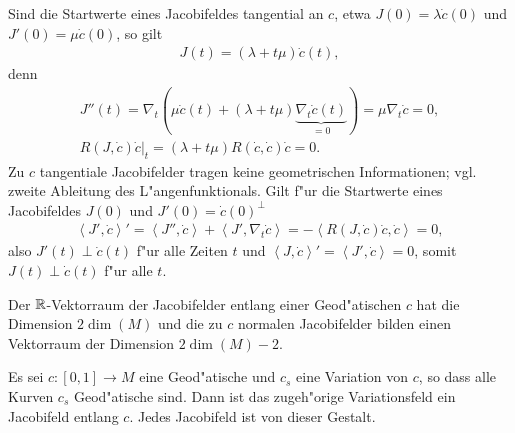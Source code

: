 Sind die Startwerte eines Jacobifeldes tangential an $c$, etwa $J(0) =
\lambda \dot c(0)$ und $J'(0) = \mu \dot c(0)$, so gilt
\begin{align*}
  J(t) = (\lambda + t\mu)\dot c(t),
\end{align*}
denn
\begin{align*}
  J''(t) = \nabla_t(\mu \dot c(t) + (\lambda + t \mu)\underbrace{\nabla_t\dot c(t)}_{=0}) = \mu\nabla_t\dot c = 0,\\
  \left.R(J,\dot c)\dot c\right|_t = (\lambda + t\mu)R(\dot c, \dot c)\dot c = 0.
\end{align*}
Zu $c$ tangentiale Jacobifelder tragen keine geometrischen Informationen; vgl. zweite Ableitung des L"angenfunktionals.
Gilt f"ur die Startwerte eines Jacobifeldes $J(0)$ und $J'(0) = \dot c(0)^{\perp}$
\begin{align*}
  \left<J',\dot c\right>' = \left<J'',\dot c\right> + \left<J', \nabla_t\dot c\right> = - \left<R(J,\dot c)\dot c,\dot c\right> = 0,
\end{align*}
also $J'(t) \perp \dot c(t)$ f"ur alle Zeiten $t$ und $\left<J,\dot c\right>' = \left<J',\dot c\right> = 0$, somit $J(t) \perp \dot c(t)$ f"ur alle $t$.

Der $\operatorname{\mathbb{R}}$-Vektorraum der Jacobifelder entlang einer Geod"atischen $c$ hat die Dimension $2 \dim(M)$ und die zu $c$ normalen Jacobifelder bilden einen Vektorraum der Dimension $2 \dim(M) - 2$.

\begin{Satz}\label{satz-9-5}
  Es sei $c \colon [0,1] \to M$ eine Geod"atische und $c_s$ eine Variation von $c$, so dass alle Kurven $c_s$ Geod"atische sind.
  Dann ist das zugeh"orige Variationsfeld ein Jacobifeld entlang $c$.
  Jedes Jacobifeld ist von dieser Gestalt.
\end{Satz}


